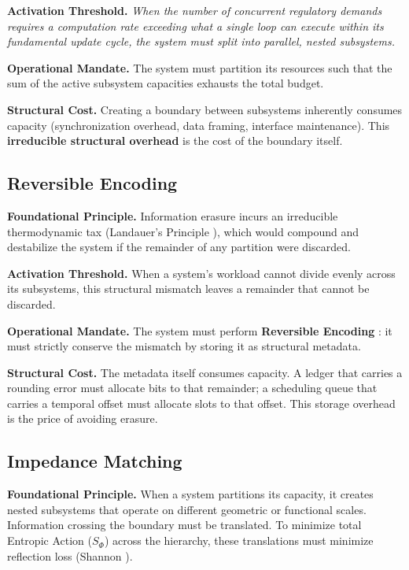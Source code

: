 \textbf{Activation Threshold.} \textit{When the number of concurrent regulatory demands requires a computation rate exceeding what a single loop can execute within its fundamental update cycle, the system must split into parallel, nested subsystems.}

\textbf{Operational Mandate.} The system must partition its resources such that the sum of the active subsystem capacities exhausts the total budget.

\textbf{Structural Cost.} Creating a boundary between subsystems inherently consumes capacity (synchronization overhead, data framing, interface maintenance). This \textbf{irreducible structural overhead} is the cost of the boundary itself.
    
\subsection{Reversible Encoding}
\label{rule_reversible_encoding}

\textbf{Foundational Principle.} Information erasure incurs an irreducible thermodynamic tax (Landauer's Principle \cite{landauer_irreversibility_1961}), which would compound and destabilize the system if the remainder of any partition were discarded.

\textbf{Activation Threshold.} When a system's workload cannot divide evenly across its subsystems, this structural mismatch leaves a remainder that cannot be discarded.

\textbf{Operational Mandate.} The system must perform \textbf{Reversible Encoding} \cite{bennett_thermodynamics_1982}: it must strictly conserve the mismatch by storing it as structural metadata.

\textbf{Structural Cost.} The metadata itself consumes capacity. A ledger that carries a rounding error must allocate bits to that remainder; a scheduling queue that carries a temporal offset must allocate slots to that offset. This storage overhead is the price of avoiding erasure.

\subsection{Impedance Matching}
\label{rule_impedance_matching}

\textbf{Foundational Principle.} When a system partitions its capacity, it creates nested subsystems that operate on different geometric or functional scales. Information crossing the boundary must be translated. To minimize total Entropic Action ($S_\Phi$) \cite{meyer_ieaction_2026} across the hierarchy, these translations must minimize reflection loss (Shannon \cite{shannon_communication_1949}).

